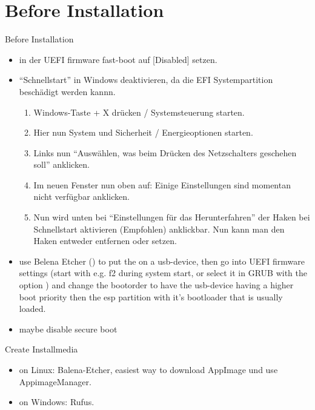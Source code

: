 
\section{Before Installation}

\begin{frame}{Before Installation}
  \begin{itemize}
    \item in der UEFI firmware fast-boot auf [Disabled] setzen.
    \item \enquote{Schnellstart} in Windows deaktivieren, da die EFI Systempartition beschädigt werden kannn.
      \begin{enumerate}
        \item Windows-Taste + X drücken / Systemsteuerung starten.
        \item Hier nun System und Sicherheit / Energieoptionen starten.
        \item Links nun \enquote{Auswählen, was beim Drücken des Netzschalters geschehen soll} anklicken.
        \item Im neuen Fenster nun oben auf: Einige Einstellungen sind momentan nicht verfügbar anklicken.
        \item Nun wird unten bei \enquote{Einstellungen für das Herunterfahren} der Haken bei Schnellstart aktivieren (Empfohlen) anklickbar. Nun kann man den Haken entweder entfernen oder setzen.
      \end{enumerate}
    \item use Belena Etcher () to put the  on a usb-device, then go into UEFI firmware settings (start with e.g. f2 during system start,  or select it in GRUB with the option ) and change the bootorder to have the usb-device having a higher boot priority then the esp partition with it's bootloader that is usually loaded.
    \item maybe disable secure boot
  \end{itemize}
\end{frame}

\begin{frame}{Create Installmedia}
  \begin{itemize}
    \item \alert{on Linux:} Balena-Etcher, easiest way to download AppImage und use AppimageManager.
    \item \alert{on Windows:} Rufus.
  \end{itemize}
\end{frame}

